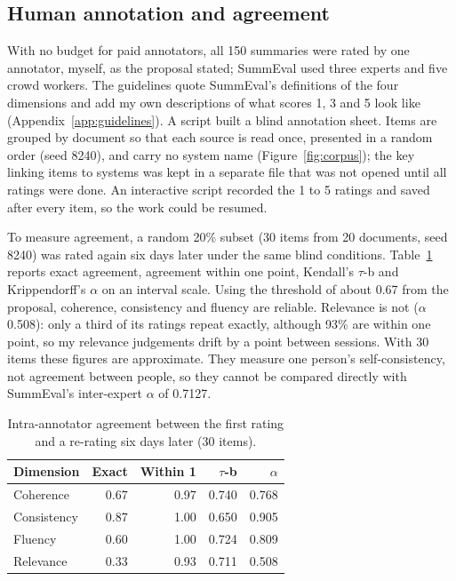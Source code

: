 \documentclass[11pt]{article}
\begin{document}
\subsection{Human annotation and agreement}
\label{sec:annotation}

With no budget for paid annotators, all 150 summaries were rated by one annotator, myself, as the proposal stated; SummEval used three experts and five crowd workers. The guidelines quote SummEval's definitions of the four dimensions and add my own descriptions of what scores 1, 3 and 5 look like (Appendix~\ref{app:guidelines}). A script built a blind annotation sheet. Items are grouped by document so that each source is read once, presented in a random order (seed 8240), and carry no system name (Figure~\ref{fig:corpus}); the key linking items to systems was kept in a separate file that was not opened until all ratings were done. An interactive script recorded the 1 to 5 ratings and saved after every item, so the work could be resumed.

To measure agreement, a random 20\% subset (30 items from 20 documents, seed 8240) was rated again six days later under the same blind conditions. Table~\ref{tab:agreement} reports exact agreement, agreement within one point, Kendall's $\tau$-b and Krippendorff's $\alpha$ \citep{krippendorff-2011-computing} on an interval scale. Using the threshold of about 0.67 from the proposal, coherence, consistency and fluency are reliable. Relevance is not ($\alpha$ 0.508): only a third of its ratings repeat exactly, although 93\% are within one point, so my relevance judgements drift by a point between sessions. With 30 items these figures are approximate. They measure one person's self-consistency, not agreement between people, so they cannot be compared directly with SummEval's inter-expert $\alpha$ of 0.7127.

\begin{table}[t]
\centering
\small
\begin{tabular}{@{}lrrrr@{}}
\toprule
Dimension & Exact & Within 1 & $\tau$-b & $\alpha$ \\
\midrule
Coherence & 0.67 & 0.97 & 0.740 & 0.768 \\
Consistency & 0.87 & 1.00 & 0.650 & 0.905 \\
Fluency & 0.60 & 1.00 & 0.724 & 0.809 \\
Relevance & 0.33 & 0.93 & 0.711 & 0.508 \\
\bottomrule
\end{tabular}
\caption{Intra-annotator agreement between the first rating and a re-rating six days later (30 items).}
\label{tab:agreement}
\end{table}
\end{document}
